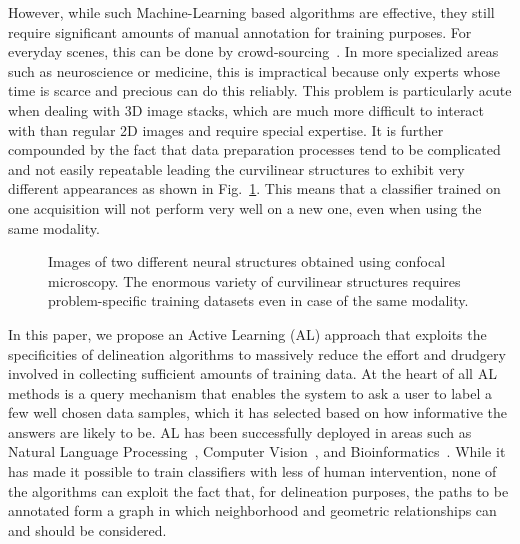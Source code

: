 \documentclass[10pt,twocolumn,letterpaper]{article}
\begin{document}
However, while such Machine-Learning based  algorithms are effective, they still
require significant  amounts of  manual annotation  for training  purposes.  For
everyday  scenes, this  can be  done by  crowd-sourcing~\cite{Long13,Lin14}.  In
more  specialized areas  such  as neuroscience  or medicine,  this  is impractical because only  experts whose  time  is scarce  and precious  can do  this
reliably. This problem is particularly acute  when dealing with 3D image stacks,
which  are much  more difficult  to  interact with  than regular  2D images  and
require  special expertise.  It  is further  compounded by  the  fact that  data
preparation processes tend  to be complicated and not  easily repeatable leading
the curvilinear structures to exhibit very different appearances
as  shown  in  Fig.~\ref{fig:differentNeurons}.  This means  that  a  classifier
trained on one  acquisition will not perform  very well on a new  one, even when
using the same modality.

\begin{figure}[t!]
\centering
{}\hspace{0.5em}

\caption{Images of two different neural structures obtained using confocal microscopy. The enormous variety of curvilinear structures requires problem-specific training datasets even in case of the same modality.}
\label{fig:differentNeurons}
\end{figure}

In this  paper, we propose  an Active Learning  (AL) approach that  exploits the
specificities  of  delineation algorithms  to massively  reduce  the  effort  and
drudgery involved  in collecting  sufficient amounts of  training data.   At the
heart of all  AL methods is a query  mechanism that enables the system  to ask a
user to label a few well chosen data samples, which it has selected based
on  how informative  the answers  are  likely to  be.  AL  has been  successfully
deployed   in   areas   such    as   Natural   Language   Processing~\cite{Tong02},   Computer
Vision~\cite{Kapoor07},                                   and
Bioinformatics~\cite{LiuB04}.   While it  has made  it possible  to
train classifiers  with less of human  intervention, none of the algorithms can exploit the fact that, for delineation purposes,
the  paths to  be annotated  form a  graph in  which neighborhood  and geometric
relationships can and should be considered.
\end{document}
